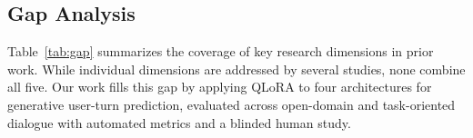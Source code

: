 \documentclass[conference]{IEEEtran}
\newcommand{\cmark}{\ding{51}}%
\newcommand{\xmark}{\ding{55}}%
\begin{document}
\subsection{Gap Analysis}

Table~\ref{tab:gap} summarizes the coverage of key research dimensions in prior work. While individual dimensions are addressed by several studies, none combine all five. Our work fills this gap by applying QLoRA to four architectures for generative user-turn prediction, evaluated across open-domain and task-oriented dialogue with automated metrics and a blinded human study.

\end{document}
